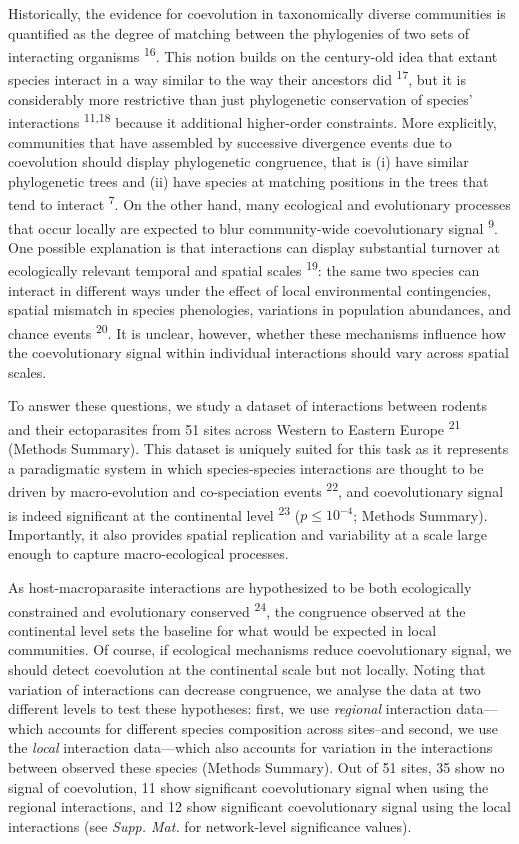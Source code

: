 \documentclass{nature}
\begin{document}
Historically, the evidence for coevolution in taxonomically diverse communities
is quantified as the degree of matching between the phylogenies of two
sets of interacting organisms \textsuperscript{16}.  This notion builds on
the century-old idea that extant species interact in a way similar to the
way their ancestors did \textsuperscript{17}, but it is considerably more
restrictive than just phylogenetic conservation of species' interactions
\textsuperscript{11,18} because it additional higher-order constraints. More
explicitly, communities that have assembled by successive divergence events
due to coevolution should display phylogenetic congruence, that is (i)
have similar phylogenetic trees and (ii) have species at matching positions
in the trees that tend to interact \textsuperscript{7}. On the other hand,
many ecological and evolutionary processes that occur locally are expected
to blur community-wide coevolutionary signal \textsuperscript{9}. One
possible explanation is that interactions can display substantial turnover
at ecologically relevant temporal and spatial scales \textsuperscript{19}:
the same two species can interact in different ways under the effect of
local environmental contingencies, spatial mismatch in species phenologies,
variations in population abundances, and chance events \textsuperscript{20}. It
is unclear, however, whether these mechanisms influence how the coevolutionary
signal within individual interactions should vary across spatial scales.

To answer these questions, we study a dataset of interactions between rodents
and their ectoparasites from 51 sites across Western to Eastern Europe
\textsuperscript{21} (Methods Summary). This dataset is uniquely suited for
this task as it represents a paradigmatic system in which species-species
interactions are thought to be driven by macro-evolution and co-speciation
events \textsuperscript{22}, and coevolutionary signal is indeed significant
at the continental level \textsuperscript{23} ($p \leq 10^{-4}$; Methods
Summary). Importantly, it also provides spatial replication and variability
at a scale large enough to capture macro-ecological processes.

As host-macroparasite interactions are hypothesized to be both ecologically
constrained and evolutionary conserved \textsuperscript{24}, the congruence
observed at the continental level sets the baseline for what would be
expected in local communities. Of course, if ecological mechanisms reduce
coevolutionary signal, we should detect coevolution at the continental scale
but not locally. Noting that variation of interactions can decrease congruence,
we analyse the data at two different levels to test these hypotheses: first,
we use \emph{regional} interaction data---which accounts for different
species composition across sites--and second, we use the \emph{local}
interaction data---which also accounts for variation in the interactions
between observed these species (Methods Summary). Out of 51 sites, 35 show no
signal of coevolution, 11 show significant coevolutionary signal when using
the regional interactions, and 12 show significant coevolutionary signal
using the local interactions (see \emph{Supp. Mat.} for network-level
significance values).
\end{document}
